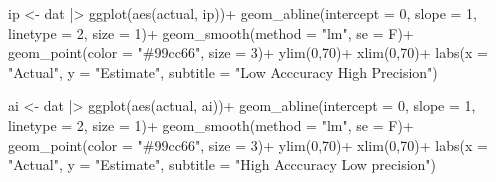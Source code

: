 \documentclass[
  letterpaper,
]{book}
\newenvironment{Shaded}{\begin{snugshade}}{\end{snugshade}}
\newcommand{\AttributeTok}[1]{\textcolor[rgb]{0.40,0.45,0.13}{#1}}
\newcommand{\DecValTok}[1]{\textcolor[rgb]{0.68,0.00,0.00}{#1}}
\newcommand{\FunctionTok}[1]{\textcolor[rgb]{0.28,0.35,0.67}{#1}}
\newcommand{\NormalTok}[1]{\textcolor[rgb]{0.00,0.23,0.31}{#1}}
\newcommand{\OtherTok}[1]{\textcolor[rgb]{0.00,0.23,0.31}{#1}}
\newcommand{\SpecialCharTok}[1]{\textcolor[rgb]{0.37,0.37,0.37}{#1}}
\newcommand{\StringTok}[1]{\textcolor[rgb]{0.13,0.47,0.30}{#1}}
\begin{document}
\begin{Shaded}
\begin{Highlighting}[]
\NormalTok{ip }\OtherTok{\textless{}{-}}\NormalTok{ dat }\SpecialCharTok{|\textgreater{}} 
  \FunctionTok{ggplot}\NormalTok{(}\FunctionTok{aes}\NormalTok{(actual, ip))}\SpecialCharTok{+}
  \FunctionTok{geom\_abline}\NormalTok{(}\AttributeTok{intercept =} \DecValTok{0}\NormalTok{, }\AttributeTok{slope =} \DecValTok{1}\NormalTok{, }
              \AttributeTok{linetype =} \DecValTok{2}\NormalTok{, }\AttributeTok{size =} \DecValTok{1}\NormalTok{)}\SpecialCharTok{+}
  \FunctionTok{geom\_smooth}\NormalTok{(}\AttributeTok{method =} \StringTok{"lm"}\NormalTok{, }\AttributeTok{se =}\NormalTok{ F)}\SpecialCharTok{+}
  \FunctionTok{geom\_point}\NormalTok{(}\AttributeTok{color =} \StringTok{"\#99cc66"}\NormalTok{, }\AttributeTok{size =} \DecValTok{3}\NormalTok{)}\SpecialCharTok{+}
  \FunctionTok{ylim}\NormalTok{(}\DecValTok{0}\NormalTok{,}\DecValTok{70}\NormalTok{)}\SpecialCharTok{+}
  \FunctionTok{xlim}\NormalTok{(}\DecValTok{0}\NormalTok{,}\DecValTok{70}\NormalTok{)}\SpecialCharTok{+}
  \FunctionTok{labs}\NormalTok{(}\AttributeTok{x =} \StringTok{"Actual"}\NormalTok{, }\AttributeTok{y =} \StringTok{"Estimate"}\NormalTok{,}
       \AttributeTok{subtitle =} \StringTok{"Low Acccuracy High Precision"}\NormalTok{)}

\NormalTok{ai }\OtherTok{\textless{}{-}}\NormalTok{ dat }\SpecialCharTok{|\textgreater{}} 
  \FunctionTok{ggplot}\NormalTok{(}\FunctionTok{aes}\NormalTok{(actual, ai))}\SpecialCharTok{+}
  \FunctionTok{geom\_abline}\NormalTok{(}\AttributeTok{intercept =} \DecValTok{0}\NormalTok{, }\AttributeTok{slope =} \DecValTok{1}\NormalTok{, }
              \AttributeTok{linetype =} \DecValTok{2}\NormalTok{, }\AttributeTok{size =} \DecValTok{1}\NormalTok{)}\SpecialCharTok{+}
  \FunctionTok{geom\_smooth}\NormalTok{(}\AttributeTok{method =} \StringTok{"lm"}\NormalTok{, }\AttributeTok{se =}\NormalTok{ F)}\SpecialCharTok{+}
  \FunctionTok{geom\_point}\NormalTok{(}\AttributeTok{color =} \StringTok{"\#99cc66"}\NormalTok{, }\AttributeTok{size =} \DecValTok{3}\NormalTok{)}\SpecialCharTok{+}
  \FunctionTok{ylim}\NormalTok{(}\DecValTok{0}\NormalTok{,}\DecValTok{70}\NormalTok{)}\SpecialCharTok{+}
  \FunctionTok{xlim}\NormalTok{(}\DecValTok{0}\NormalTok{,}\DecValTok{70}\NormalTok{)}\SpecialCharTok{+}
  \FunctionTok{labs}\NormalTok{(}\AttributeTok{x =} \StringTok{"Actual"}\NormalTok{, }\AttributeTok{y =} \StringTok{"Estimate"}\NormalTok{,}
       \AttributeTok{subtitle =} \StringTok{"High Acccuracy Low precision"}\NormalTok{)}


\end{Highlighting}
\end{Shaded}
\end{document}
